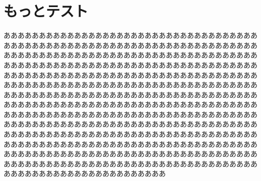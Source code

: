 \documentclass{beamer}
\begin{document}
\section{もっとテスト}
\begin{frame}
あああああああああああああああああああああああああああああああああああああああああああああああああああああああああああああああああああああああああああああああああああああああああああああああああああああああああああああああああああああああああああああああああああああああああああああああああああああああああああああああああああああああああああああああああああああああああああああああああああああああああああああああああああああああああああああああああああああああああああああああああああああああああああああああああああああああああああああああああああああああああああああああああああああああああああああああああああああああああああああああああああああああああああああああああああああああああああああああああああああああああああああああああああああああああああああああああああああああああああああああああああああああああああああああああああああああああああああああああああああああああああああああああああああああああああああああああああああああああああああああああああああああああああああああああああああああああああああああああああああああああああああああ
\end{frame}
\end{document}
